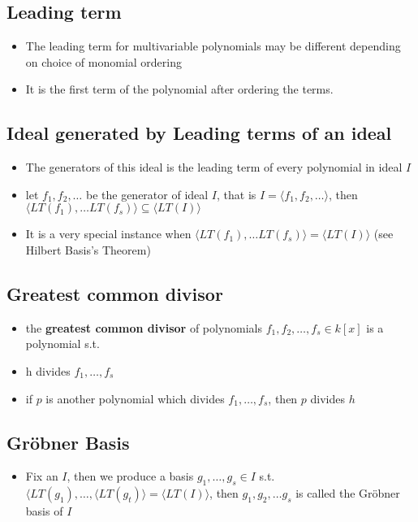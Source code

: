 \documentclass[11pt]{article}
\begin{document}
\subsection{Leading term}
\begin{itemize}
    \item The leading term for multivariable polynomials may be different depending on choice of monomial ordering
    \item It is the first term of the polynomial after ordering the terms. 


\end{itemize}

\subsection{Ideal generated by Leading terms of an ideal}
\begin{itemize}

$$\langle LT(I)\rangle$$
    \item The generators of this ideal is the leading term of every polynomial in ideal $I$
    \item let $f_1, f_2, \dots$ be the generator of ideal $I$, that is $I = \langle f_1, f_2, \dots \rangle$, then $\langle LT(f_1), \dots LT(f_s)\rangle \subseteq \langle LT(I)\rangle$
    \item It is a very special instance when $\langle LT(f_1), \dots LT(f_s)\rangle = \langle LT(I)\rangle$ (see Hilbert Basis's Theorem) 
\end{itemize}



\subsection{Greatest common divisor}
\begin{itemize}
    \item the \textbf{greatest common divisor} of polynomials $f_1, f_2, \dots, f_s \in k[x]$ is a polynomial s.t.
        \item h divides $f_1, \dots, f_s$
        \item if $p$ is another polynomial which divides $f_1, \dots, f_s$, then $p$ divides $h$
\end{itemize}


\subsection{Gröbner Basis}
\begin{itemize}
    \item Fix an $I$, then we produce a basis $g_1, \dots, g_s \in I$ s.t. $\langle LT(g_1), \dots, \langle LT(g_t)\rangle = \langle LT(I)\rangle$, then $g_1, g_2, \dots g_s$ is called the Gröbner basis of $I$
\end{itemize}
\end{document}
